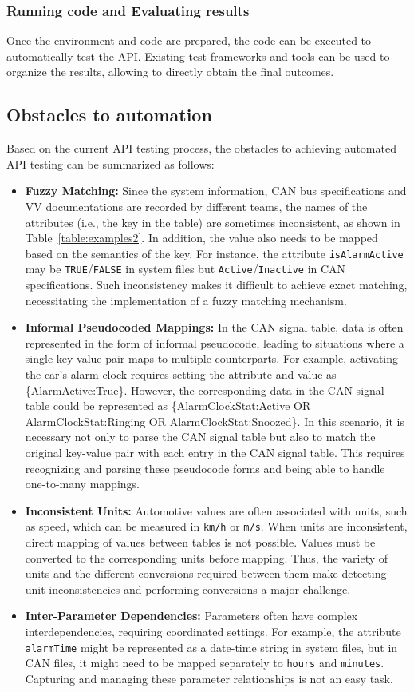\subsubsection{Running code and Evaluating results}
Once the environment and code are prepared, the code can be executed to automatically test the API. Existing test frameworks and tools can be used to organize the results, allowing to directly obtain the final outcomes. 

\subsection{Obstacles to automation}
Based on the current API testing process, the obstacles to achieving automated API testing can be summarized as follows:

\begin{itemize}
  \item \textbf{Fuzzy Matching:} Since the system information, CAN bus specifications and VV documentations are recorded by different teams, the names of the attributes (i.e., the key in the table) are sometimes inconsistent, as shown in Table~\ref{table:examples2}. 
  In addition, the value also needs to be mapped based on the semantics of the key.
  For instance, the attribute \texttt{isAlarmActive} may be \texttt{TRUE}/\texttt{FALSE} in system files but \texttt{Active}/\texttt{Inactive} in CAN specifications. 
  Such inconsistency makes it difficult to achieve exact matching, necessitating the implementation of a fuzzy matching mechanism.
  \item \textbf{Informal Pseudocoded Mappings:} 
  In the CAN signal table, data is often represented in the form of informal pseudocode, leading to situations where a single key-value pair maps to multiple counterparts. For example, activating the car's alarm clock requires setting the attribute and value as \{AlarmActive:True\}. However, the corresponding data in the CAN signal table could be represented as \{AlarmClockStat:Active OR AlarmClockStat:Ringing OR AlarmClockStat:Snoozed\}.
  In this scenario, it is necessary not only to parse the CAN signal table but also to match the original key-value pair with each entry in the CAN signal table. This requires recognizing and parsing these pseudocode forms and being able to handle one-to-many mappings.
  \item \textbf{Inconsistent Units:} Automotive values are often associated with units, such as speed, which can be measured in \texttt{km/h} or \texttt{m/s}. When units are inconsistent, direct mapping of values between tables is not possible. Values must be converted to the corresponding units before mapping. Thus, the variety of units and the different conversions required between them make detecting unit inconsistencies and performing conversions a major challenge.
  \item \textbf{Inter-Parameter Dependencies:} Parameters often have complex interdependencies, requiring coordinated settings. For example, the attribute \texttt{alarmTime} might be represented as a date-time string in system files, but in CAN files, it might need to be mapped separately to \texttt{hours} and \texttt{minutes}. Capturing and managing these parameter relationships is not an easy task.
\end{itemize}
